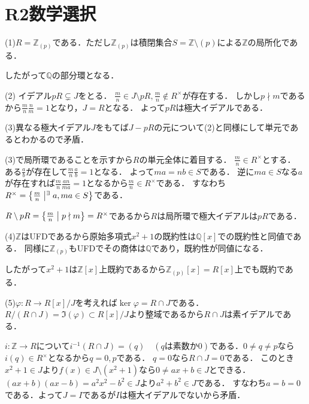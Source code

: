 \documentclass[
		book,
		head_space=20mm,
		foot_space=20mm,
		gutter=10mm,
		line_length=190mm
]{jlreq}
\begin{document}
\section{R2数学選択}
(1)$R=\mathbb{Z}_{(p)}$である．ただし$\mathbb{Z}_{(p)}$は積閉集合$S=\mathbb{Z}\setminus (p)$による$\mathbb{Z}$の局所化である．

したがって$\mathbb{Q}$の部分環となる．

(2)
    イデアル$pR\subsetneq J$をとる．
    $\frac{m}{n}\in J\setminus pR,\frac{m}{n}\notin R^\times$が存在する．
    しかし$p\nmid m$であるから$\frac{m}{n}\frac{n}{m}=1$となり，$J=R$となる．
	よって$pR$は極大イデアルである．

    (3)異なる極大イデアル$J$をもてば$J-pR$の元について(2)と同様にして単元であるとわかるので矛盾．


\begin{tcolorbox}[blanker,breakable,
	left=3mm,right=3mm,
	top=3mm,bottom=3mm,
	before skip=15pt,after skip=15pt,
	borderline vertical={1pt}{0pt}{black,dotted}]
	(3)で局所環であることを示すから$R$の単元全体に着目する．
    $\frac{m}{n}\in R^\times$とする．
    ある$\frac{a}{b}$が存在して$\frac{m}{n}\frac{a}{b}=1$となる．
    よって$ma=nb\in S$である．
    逆に$ma\in S$なる$a$が存在すれば$\frac{m}{n}\frac{an}{ma}=1$となるから$\frac{m}{n}\in R^\times$である．
    すなわち$R^\times=\left\{ \frac{m}{n}\mathrel{}\middle|\mathrel{} ^\exists a, ma\in S\right\}$である．

    $R\setminus pR =\left\{ \frac{m}{n}\mathrel{}\middle|\mathrel{} p\nmid m \right\}=R^\times$であるから$R$は局所環で極大イデアルは$pR$である．    
	\end{tcolorbox}

(4)$\mathbb{Z}$はUFDであるから原始多項式$x^2+1$の既約性は$\mathbb{Q}[x]$での既約性と同値である．
	同様に$\mathbb{Z}_{(p)}$もUFDでその商体は$\mathbb{Q}$であり，既約性が同値になる．

	したがって$x^2+1$は$\mathbb{Z}[x]$上既約であるから$\mathbb{Z}_{(p)}[x]=R[x]$上でも既約である．

(5)$\varphi\colon R\rightarrow R[x]/J$を考えれば$\ker \varphi=R \cap J$である．$R/(R\cap J)=\Im(\varphi)\subset R[x]/J$より整域であるから$R\cap J$は素イデアルである．

$i\colon \mathbb{Z} \rightarrow R$について$i^{-1}(R\cap J)=(q)\quad(q\text{は素数か}0)$である．$0\neq q\neq p$なら$i(q)\in R^\times$となるから$q=0,p$である．
$q=0$なら$R\cap J=0$である．
このとき$x^2+1\in J$より$f(x)\in J\setminus (x^2+1)$なら$0\neq ax+b\in J$とできる．
$(ax+b)(ax-b)=a^2x^2-b^2\in J$より$a^2+b^2\in J$である．
すなわち$a=b=0$である．よって$J=I$であるが$I$は極大イデアルでないから矛盾．
\end{document}
